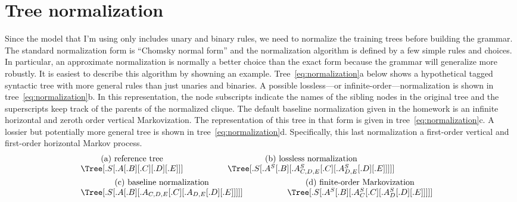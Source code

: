 \documentclass[11pt]{article}
\newcommand{\eqlabel}[1]{\label{eq:#1}}
\begin{document}
\section{Tree normalization}

Since the model that I'm using only includes unary and binary rules, we need
to normalize the training trees before building the grammar.
The standard normalization form is ``Chomsky normal form'' and the
normalization algorithm is defined by a few simple rules and choices.
In particular, an approximate normalization is normally a better choice than
the exact form because the grammar will generalize more robustly.
It is easiest to describe this algorithm by showning an example.
Tree~\ref{eq:normalization}a below shows a hypothetical tagged syntactic tree
with more general rules than just unaries and binaries.
A possible lossless---or infinite-order---normalization is shown in
tree~\ref{eq:normalization}b.
In this representation, the node subscripts indicate the names of the sibling
nodes in the original tree and the superscripts keep track of the parents of
the normalized clique.
The default baseline normalization given in the homework is an infinite
horizontal and zeroth order vertical Markovization.
The representation of this tree in that form is given in
tree~\ref{eq:normalization}c.
A lossier but potentially more general tree is shown in
tree~\ref{eq:normalization}d.
Specifically, this last normalization a first-order vertical and
first-order horizontal Markov process.
\begin{eqnarray}\eqlabel{normalization}
&\begin{array}{cc}
\mbox{(a) reference tree} &
\mbox{(b) lossless normalization} \\
\hspace{0.3in}
\Tree [.S [.A [.B ] [.C ] [.D ] [.E ]]]
\hspace{0.3in} & \hspace{0.3in}
\Tree [.S [.A^S [.B ] [.A^S_{C,D,E} [.C ] [.A^S_{D,E} [.D ] [.E ]]]]]
\hspace{0.3in}
\end{array}& \nonumber\\
&\begin{array}{cc}
\mbox{(c) baseline normalization} &
\mbox{(d) finite-order Markovization} \\
\hspace{0.3in}
\Tree [.S [.A [.B ] [.A_{C,D,E} [.C ] [.A_{D,E} [.D ] [.E ]]]]]
\hspace{0.3in} & \hspace{0.3in}
\Tree [.S [.A^S [.B ] [.A^S_{C} [.C ] [.A^S_{D} [.D ] [.E ]]]]]
\hspace{0.3in}
\end{array}&
\end{eqnarray}
\end{document}
